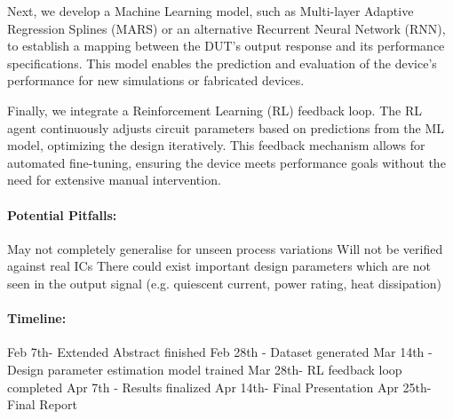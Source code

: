 \documentclass[a4paper, 12pt]{article}
\begin{document}
Next, we develop a Machine Learning model, such as Multi-layer Adaptive Regression Splines (MARS) or an alternative Recurrent Neural Network (RNN), to establish a mapping between the DUT’s output response and its performance specifications. This model enables the prediction and evaluation of the device’s performance for new simulations or fabricated devices.

Finally, we integrate a Reinforcement Learning (RL) feedback loop. The RL agent continuously adjusts circuit parameters based on predictions from the ML model, optimizing the design iteratively. This feedback mechanism allows for automated fine-tuning, ensuring the device meets performance goals without the need for extensive manual intervention.

\paragraph
{\bf Potential Pitfalls:}
May not completely generalise for unseen process variations
Will not be verified against real ICs
There could exist important design parameters which are not seen in the output signal (e.g. quiescent current, power rating, heat dissipation)

\paragraph
{\bf Timeline:}
Feb 7th- Extended Abstract finished
Feb 28th - Dataset generated
Mar 14th - Design parameter estimation model trained
Mar 28th- RL feedback loop completed
Apr 7th - Results finalized 
Apr 14th- Final Presentation
Apr 25th- Final Report
\end{document}
